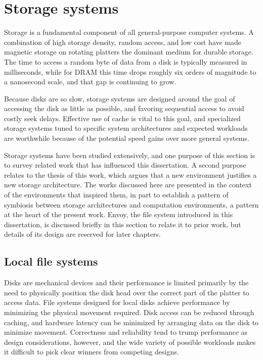 \cite{kotsovinos04b}


\section{Storage systems}

Storage is a fundamental component of all general-purpose computer systems. A combination of high storage density, random access, and low cost have made magnetic storage on rotating platters the dominant medium for durable storage. The time to access a random byte of data from a disk is typically measured in milliseconds, while for DRAM this time drops roughly six orders of magnitude to a nanosecond scale, and that gap is continuing to grow.

Because disks are so slow, storage systems are designed around the goal of accessing the disk as little as possible, and favoring sequential access to avoid costly seek delays. Effective use of cache is vital to this goal, and specialized storage systems tuned to specific system architectures and expected workloads are worthwhile because of the potential speed gains over more general systems.

Storage systems have been studied extensively, and one purpose of this section is to survey related work that has influenced this dissertation. A second purpose relates to the thesis of this work, which argues that a new environment justifies a new storage architecture. The works discussed here are presented in the context of the environments that inspired them, in part to establish a pattern of symbiosis between storage architectures and computation environments, a pattern at the heart of the present work. Envoy, the file system introduced in this dissertation, is discussed briefly in this section to relate it to prior work, but details of its design are reserved for later chapters.

\subsection{Local file systems}

Disks are mechanical devices and their performance is limited primarily by the need to physically position the disk head over the correct part of the platter to access data. File systems designed for local disks achieve performance by minimizing the physical movement required. Disk access can be reduced through caching, and hardware latency can be minimized by arranging data on the disk to minimize movement. Correctness and reliability tend to trump performance as design considerations, however, and the wide variety of possible workloads makes it difficult to pick clear winners from competing designs.

